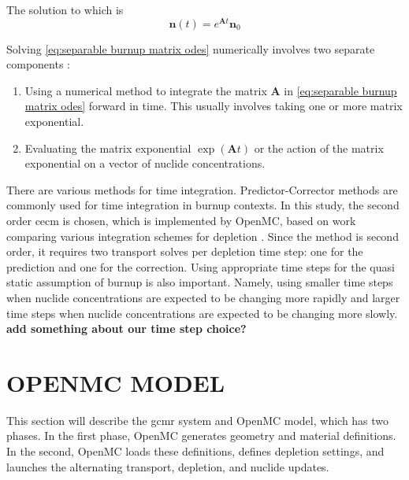 \documentclass[letterpaper]{physor2024}
\begin{document}
\noindent The solution to which is
\begin{equation} \label{eq:separation solution}
     \textbf{n}(t) = e^{\textbf{A}t} \textbf{n}_{0}
\end{equation}

\noindent Solving \cref{eq:separable burnup matrix odes} numerically involves two separate components \cite{romano-depletion-2021}:
\begin{enumerate}
    \item Using a numerical method to integrate the matrix $\textbf{A}$ in \cref{eq:separable burnup matrix odes} forward in time. This usually involves taking one or more matrix exponential.
    \item Evaluating the matrix exponential $\exp(\textbf{A}t)$ or the action of the matrix exponential on a vector of nuclide concentrations.
\end{enumerate}

There are various methods for time integration. Predictor-Corrector methods are commonly used for time integration in burnup contexts. In this study, the second order \gls{cecm} is chosen, which is implemented by OpenMC, based on work comparing various integration schemes for depletion \cite{isotalo_comparison_2015}. Since the method is second order, it requires two transport solves per depletion time step: one for the prediction and one for the correction. Using appropriate time steps for the quasi static assumption of burnup is also important. Namely, using smaller time steps when nuclide concentrations are expected to be changing more rapidly and larger time steps when nuclide concentrations are expected to be changing more slowly. \textbf{add something about our time step choice?}

\section{OPENMC MODEL}\label{sec:openmc_model}
This section will describe the \gls{gcmr} system and OpenMC model, which has two phases. In the first phase, OpenMC generates geometry and material definitions. In the second, OpenMC loads these definitions, defines depletion settings, and launches the alternating transport, depletion, and nuclide updates.
\end{document}
